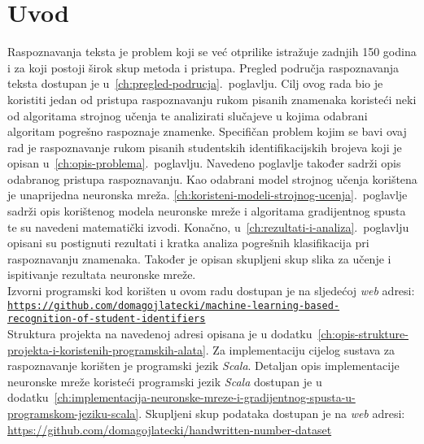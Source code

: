 \chapter{Uvod}
\label{ch:uvod}
Raspoznavanja teksta je problem koji se već otprilike istražuje zadnjih 150 godina i za koji postoji širok skup metoda i
pristupa. Pregled područja raspoznavanja teksta dostupan je u\ \ref{ch:pregled-podrucja}.\ poglavlju. Cilj ovog rada bio
je koristiti jedan od pristupa raspoznavanju rukom pisanih znamenaka koristeći neki od algoritama strojnog učenja te
analizirati slučajeve u kojima odabrani algoritam pogrešno raspoznaje znamenke. Specifičan problem kojim se
bavi ovaj rad je raspoznavanje rukom pisanih studentskih identifikacijskih brojeva koji je opisan
u\ \ref{ch:opis-problema}.\ poglavlju. Navedeno poglavlje također sadrži opis odabranog pristupa raspoznavanju. Kao
odabrani model strojnog učenja korištena je unaprijedna neuronska mreža.
\ref{ch:koristeni-modeli-strojnog-ucenja}.\ poglavlje sadrži opis korištenog modela neuronske mreže i algoritama
gradijentnog spusta te su navedeni matematički izvodi. Konačno, u\ \ref{ch:rezultati-i-analiza}.\ poglavlju opisani su
postignuti rezultati i kratka analiza pogrešnih klasifikacija pri raspoznavanju znamenaka. Također je opisan skupljeni
skup slika za učenje i ispitivanje rezultata neuronske mreže.\\
Izvorni programski kod korišten u ovom radu dostupan je na sljedećoj \emph{web} adresi:\\
\small\href{https://github.com/domagojlatecki/machine-learning-based-recognition-of-student-identifiers}
{\texttt{https://github.com/domagojlatecki/machine-learning-based-\\recognition-of-student-identifiers}}\\
\normalsize
Struktura projekta na navedenoj adresi opisana je u
dodatku\ \ref{ch:opis-strukture-projekta-i-koristenih-programskih-alata}. Za implementaciju cijelog sustava za
raspoznavanje korišten je programski jezik \emph{Scala}. Detaljan opis implementacije neuronske mreže koristeći
programski jezik \emph{Scala} dostupan je u
dodatku\ \ref{ch:implementacija-neuronske-mreze-i-gradijentnog-spusta-u-programskom-jeziku-scala}. Skupljeni skup
podataka dostupan je na \emph{web} adresi:\\
\small
\url{https://github.com/domagojlatecki/handwritten-number-dataset}
\normalsize
